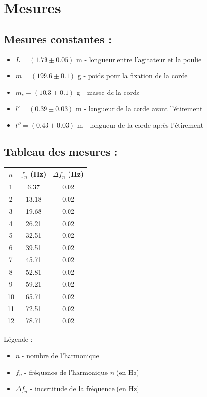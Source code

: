 \documentclass[12pt,a4paper]{article}
\begin{document}
    \section{Mesures}
    \subsection{Mesures constantes :}
    \begin{itemize}
        \item $L=(1.79 \pm 0.05)$ m - longueur entre l'agitateur et la poulie
        \item $m=(199.6 \pm 0.1)$ g - poids pour la fixation de la corde
        \item $m_c=(10.3 \pm 0.1)$ g - masse de la corde
        \item $l'=(0.39 \pm 0.03)$ m - longueur de la corde avant l'étirement
        \item $l''=(0.43 \pm 0.03)$ m - longueur de la corde après l'étirement
    \end{itemize}
    \subsection{Tableau des mesures :}

    \begin{minipage}{0.4\textwidth}
        \centering
        \begin{tabular}{c|c|c}
            \toprule
            $n$ & $f_n$ (Hz)  & $\Delta f_n$ (Hz) \\
            \midrule
            1  & 6.37  & 0.02 \\
            2  & 13.18 & 0.02 \\
            3  & 19.68 & 0.02 \\
            4  & 26.21 & 0.02 \\
            5  & 32.51 & 0.02 \\
            6  & 39.51 & 0.02 \\
            7  & 45.71 & 0.02 \\
            8  & 52.81 & 0.02 \\
            9  & 59.21 & 0.02 \\
            10 & 65.71 & 0.02 \\
            11 & 72.51 & 0.02 \\
            12 & 78.71 & 0.02 \\
            \bottomrule
        \end{tabular}
    \end{minipage}%
    \hfill
    \begin{minipage}{0.6\textwidth}
        Légende :
        \begin{itemize}
            \item $n$ - nombre de l'harmonique
            \item $f_n$ - fréquence de l'harmonique $n$ (en Hz)
            \item $\Delta f_n$ - incertitude de la fréquence (en Hz)
        \end{itemize}
    \end{minipage}
\end{document}
